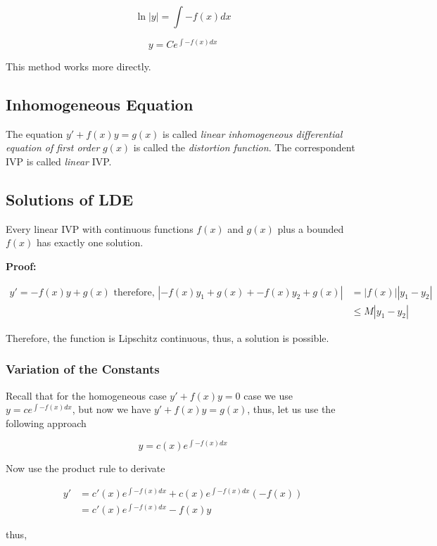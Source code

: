 \[
    \ln|y| = \int -f(x) dx
\]

\[
    y = C e^{\int -f(x) dx}
\]

This method works more directly.

\subsection{Inhomogeneous Equation}

The equation \(y' + f(x)y = g(x)\) is called \emph{linear inhomogeneous differential equation 
of first order} \(g(x)\) is called the \emph{distortion function}. The correspondent IVP is called
\emph{linear} IVP\@.

\subsection{Solutions of LDE}

Every linear IVP with continuous functions \(f(x)\) and \(g(x)\) plus a bounded \(f(x)\) 
has exactly one solution.

\textbf{Proof:}

\begin{align*}
    y' = -f(x)y + g(x) \text{ therefore, } |-f(x)y_1 + g(x) + -f(x)y_2 + g(x) | &= |f(x)||y_1 - y_2|\\
                                                                            &\le M |y_1 - y_2|
\end{align*}

Therefore, the function is Lipschitz continuous, thus, a solution is possible.
\QED

\subsubsection{Variation of the Constants}

Recall that for the homogeneous case \(y' + f(x)y = 0\) case we use 
\(y = c e^{\int -f(x) dx}\), but now we have \(y' + f(x)y = g(x)\), thus, let us use the following
approach

\[
    y = c(x) e^{\int -f(x) dx}
\]

Now use the product rule to derivate

\begin{align*}
    y' &= c'(x) e^{\int -f(x) dx} + c(x)e^{\int -f(x) dx}(-f(x))\\
    &= c'(x)e^{\int -f(x) dx} - f(x)y
\end{align*}

thus, 


